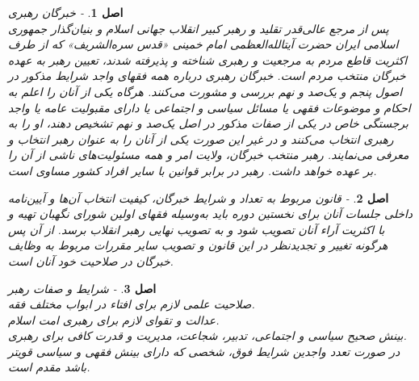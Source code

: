 \documentclass[12pt]{article}
\newtheorem{asl}{اصل}
\begin{document}
\begin{asl}- 
خبرگان رهبری 
\\
پس از مرجع عالی‌قدر تقلید و رهبر کبیر انقلاب جهانی اسلام و بنیان‌گذار جمهوری اسلامی ایران حضرت آیت‏الله‏‌العظمی امام خمینی «قدس سره‏‌الشریف» که از طرف اکثریت قاطع مردم به مرجعیت و رهبری شناخته و پذیرفته شدند، تعیین رهبر به عهده خبرگان منتخب مردم است. خبرگان رهبری درباره همه فقهای واجد شرایط مذکور در اصول پنجم و یک‌صد و نهم بررسی و مشورت می‌کنند. هرگاه یکی از آنان را اعلم به احکام و موضوعات فقهی یا مسائل سیاسی و اجتماعی یا دارای مقبولیت عامه یا واجد برجستگی خاص در یکی از صفات مذکور در اصل یک‌صد و نهم تشخیص دهند، او را به رهبری انتخاب می‌کنند و در غیر این صورت یکی از آنان را به عنوان رهبر انتخاب و معرفی می‌نمایند. رهبر منتخب خبرگان، ولایت امر و همه مسئولیت‌های ناشی از آن را بر عهده خواهد داشت. رهبر در برابر قوانین با سایر افراد کشور مساوی است. 
 
\end{asl}

\begin{asl}- 
قانون مربوط به تعداد و شرایط خبرگان، کیفیت انتخاب آن‌ها و آیین‏‌نامه داخلی جلسات آنان برای نخستین دوره باید به‌وسیله فقهای اولین شورای نگهبان تهیه و با اکثریت آراء آنان تصویب شود و به تصویب نهایی رهبر انقلاب برسد. از آن پس هرگونه تغییر و تجدیدنظر در این قانون و تصویب سایر مقررات مربوط به وظایف خبرگان در صلاحیت خود آنان است.  
\end{asl}

\begin{asl}- 
شرایط و صفات رهبر 
\\
صلاحیت علمی لازم برای افتاء در ابواب مختلف فقه. 
\\
عدالت و تقوای لازم برای رهبری امت اسلام. 
\\
بینش صحیح سیاسی و اجتماعی، تدبیر، شجاعت، مدیریت و قدرت کافی برای رهبری. 
\\
در صورت تعدد واجدین شرایط فوق، شخصی که دارای بینش فقهی و سیاسی قوی‏تر باشد مقدم است. 
\end{asl}
\end{document}
